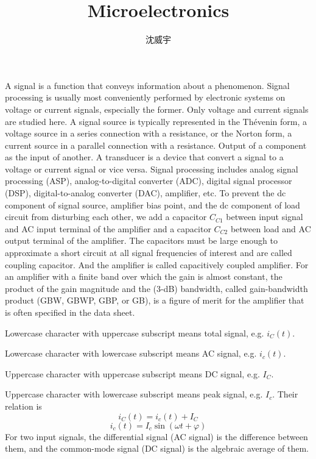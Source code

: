 \documentclass[a4paper,12pt]{report}
\begin{document}
\title{Microelectronics}
\author{沈威宇}
\date{\temtoday}
\titletocdoc
{}
A signal is a function that conveys information about a phenomenon. Signal processing is usually most conveniently performed by electronic systems on voltage or current signals, especially the former. Only voltage and current signals are studied here.
A signal source is typically represented in the Thévenin form, a voltage source in a series connection with a resistance, or the Norton form, a current source in a parallel connection with a resistance.
Output of a component as the input of another.
A transducer is a device that convert a signal to a voltage or current signal or vice versa.
Signal processing includes analog signal processing (ASP), analog-to-digital converter (ADC), digital signal processor (DSP), digital-to-analog converter (DAC), amplifier, etc.
To prevent the dc component of signal source, amplifier bias point, and the dc component of load circuit from disturbing each other, we add a capacitor $C_{C1}$ between input signal and AC input terminal of the amplifier and a capacitor $C_{C2}$ between load and AC output terminal of the amplifier. The capacitors must be large enough to approximate a short circuit at all signal frequencies of interest and are called coupling capacitor. And the amplifier is called capacitively coupled amplifier.
For an amplifier with a finite band over which the gain is almost constant, the product of the gain magnitude and the (3-dB) bandwidth, called gain-bandwidth product (GBW, GBWP, GBP, or GB), is a figure of merit for the amplifier that is often specified in the data sheet.
\bit
\item Lowercase character with uppercase subscript means total signal, e.g. $i_C(t)$.
\item Lowercase character with lowercase subscript means AC signal, e.g. $i_c(t)$.
\item Uppercase character with uppercase subscript means DC signal, e.g. $I_C$.
\item Uppercase character with lowercase subscript means peak signal, e.g. $I_c$.
\eit
Their relation is
\[i_C(t)=i_c(t)+I_C\]
\[i_c(t)=I_c\sin(\omega t+\varphi)\]
For two input signals, the differential signal (AC signal) is the difference between them, and the common-mode signal (DC signal) is the algebraic average of them.
\end{document}
